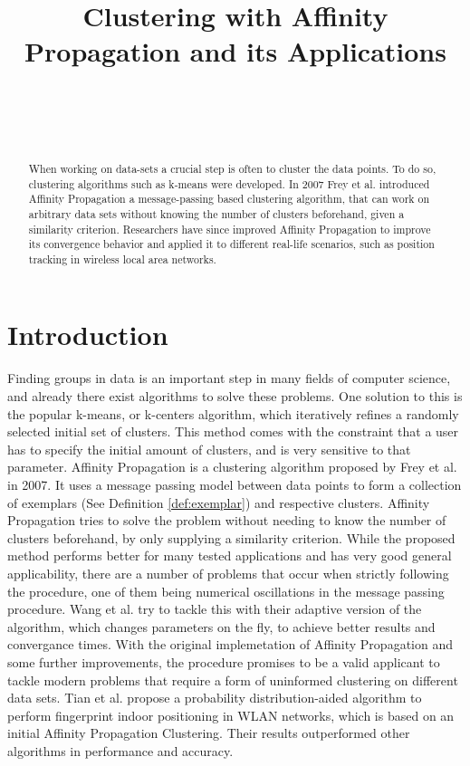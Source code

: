 \documentclass[11pt,a4paper]{article}
\title{Clustering with Affinity Propagation and its Applications}
\author{
 \authorname{Philipp-Alexander Auer} \\
 \studentnumber{01420446} \\
 \curriculum{033 535} \\
 \email{e1420446@student.tuwien.ac.at}
}
\begin{document}
\maketitle

\begin{abstract}
When working on data-sets a crucial step is often to cluster the data points. To do so, clustering algorithms such as k-means were developed. In 2007 Frey et al. introduced Affinity Propagation\cite{frey2007clustering} a message-passing based clustering algorithm, that can work on arbitrary data sets without knowing the number of clusters beforehand, given a similarity criterion. Researchers have since improved Affinity Propagation to improve its convergence behavior\cite{wang2008adaptive} and applied it to different real-life scenarios, such as position tracking in wireless local area networks.\cite{tian2013fingerprint}
\end{abstract}

\section{Introduction}

Finding groups in data is an important step in many fields of computer science, and already there exist algorithms to solve these problems. One solution to this is the popular k-means, or k-centers algorithm, which iteratively refines a randomly selected initial set of clusters. This method comes with the constraint that a user has to specify the initial amount of clusters, and is very sensitive to that parameter. \cite{frey2007clustering} 
Affinity Propagation is a clustering algorithm proposed by Frey et al. in 2007. It uses a message passing model between data points to form a collection of exemplars (See Definition \ref{def:exemplar}) and respective clusters. \cite{frey2007clustering} Affinity Propagation tries to solve the problem without needing to know the number of clusters beforehand, by only supplying a similarity criterion.
While the proposed method performs better for many tested applications \cite{frey2007clustering} and has very good general applicability, there are a number of problems that occur when strictly following the procedure, one of them being numerical oscillations in the message passing procedure. Wang et al. try to tackle this with their adaptive version of the algorithm, which changes parameters on the fly, to achieve better results and convergance times. \cite{wang2008adaptive} With the original implemetation of Affinity Propagation and some further improvements, the procedure promises to be a valid applicant to tackle modern problems that require a form of uninformed clustering on different data sets. Tian et al. propose a probability distribution-aided algorithm to perform fingerprint indoor positioning in WLAN networks, which is based on an initial Affinity Propagation Clustering. Their results outperformed other algorithms in performance and accuracy. \cite{tian2013fingerprint}
\end{document}
